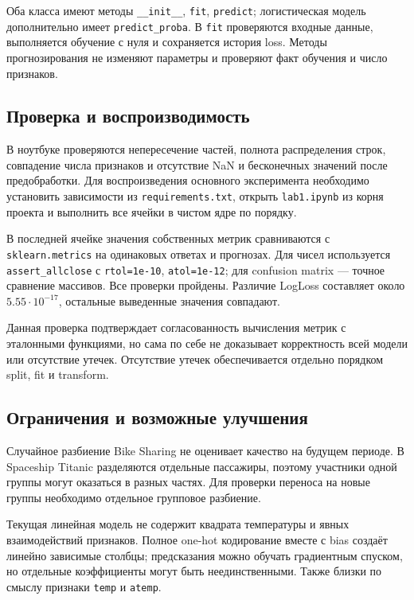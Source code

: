 \documentclass[a4paper,12pt]{article}
\newcommand{\code}[1]{\texttt{#1}}
\begin{document}
Оба класса имеют методы \code{\_\_init\_\_}, \code{fit}, \code{predict};
логистическая модель дополнительно имеет \code{predict\_proba}.
В \code{fit} проверяются входные данные, выполняется обучение с нуля
и сохраняется история loss. Методы прогнозирования не изменяют параметры
и проверяют факт обучения и число признаков.

\subsection{Проверка и воспроизводимость}

В ноутбуке проверяются непересечение частей, полнота распределения строк,
совпадение числа признаков и отсутствие NaN и бесконечных значений
после предобработки. Для воспроизведения основного эксперимента
необходимо установить зависимости из \code{requirements.txt},
открыть \code{lab1.ipynb} из корня проекта и выполнить все ячейки
в чистом ядре по порядку.

В последней ячейке значения собственных метрик сравниваются
с \code{sklearn.metrics} на одинаковых ответах и прогнозах.
Для чисел используется \code{assert\_allclose}
с \code{rtol=1e-10}, \code{atol=1e-12};
для confusion matrix --- точное сравнение массивов.
Все проверки пройдены. Различие LogLoss составляет около
$5.55\cdot10^{-17}$, остальные выведенные значения совпадают.

Данная проверка подтверждает согласованность вычисления метрик
с эталонными функциями, но сама по себе не доказывает корректность
всей модели или отсутствие утечек. Отсутствие утечек обеспечивается
отдельно порядком split, fit и transform.

\subsection{Ограничения и возможные улучшения}

Случайное разбиение Bike Sharing не оценивает качество на будущем периоде.
В Spaceship Titanic разделяются отдельные пассажиры, поэтому участники
одной группы могут оказаться в разных частях. Для проверки переноса
на новые группы необходимо отдельное групповое разбиение.

Текущая линейная модель не содержит квадрата температуры и явных
взаимодействий признаков. Полное one-hot кодирование вместе с bias
создаёт линейно зависимые столбцы; предсказания можно обучать
градиентным спуском, но отдельные коэффициенты могут быть неединственными.
Также близки по смыслу признаки \code{temp} и \code{atemp}.
\end{document}
